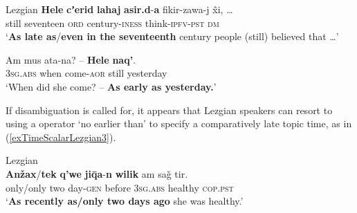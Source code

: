 \begin{exe}
	\ex \label{exTimeScalarLezgian}
	\begin{xlist}
		\exi{}Lezgian
		\ex \label{exTimeScalarLezgian1}
		 \gll \textbf{Hele} \textbf{cʼerid} \textbf{lahaj} \textbf{asir.d}-\textbf{a} fikir-zawa-j x̂i, …\\
		still seventeen \textsc{ord} century-\textsc{iness} think-\textsc{ipfv}-\textsc{pst} \textsc{dm}\\
		\glt \lq \textbf{As late as}/\textbf{even in the seventeenth} century people (still) believed that …' \parencite[90]{Haspelmath1991}
	
	\ex \label{exTimeScalarLezgian2}
	\gll Am mus ata-na? – \textbf{Hele} \textbf{naq'}.\\
	3\textsc{sg}.\textsc{abs} when come-\textsc{aor} {} still yesterday\\
\glt \lq When did she come? -- \textbf{As early as yesterday.}\rq{}
\\\parencite[85]{Haspelmath1991}
	\end{xlist}
\end{exe}

If disambiguation is called for, it appears that Lezgian speakers can resort to using a  operator \lq no earlier than\rq{ }to specify a comparatively late topic time, as in (\ref{exTimeScalarLezgian3}).

\begin{exe}
	\ex Lezgian\label{exTimeScalarLezgian3}\\
	\gll \textbf{Anžax}\textup{/}\textbf{tek} \textbf{q'we} \textbf{jiq̄a}-\textbf{n} \textbf{wilik} am saǧ tir.\\
		only/only two day-\textsc{gen} before 3\textsc{sg}.\textsc{abs} healthy \textsc{cop}.\textsc{pst}\\
		\glt \lq \textbf{As recently as/only two days ago} she was healthy.\rq{}
		\\\parencite[90]{Haspelmath1991}
\end{exe}

